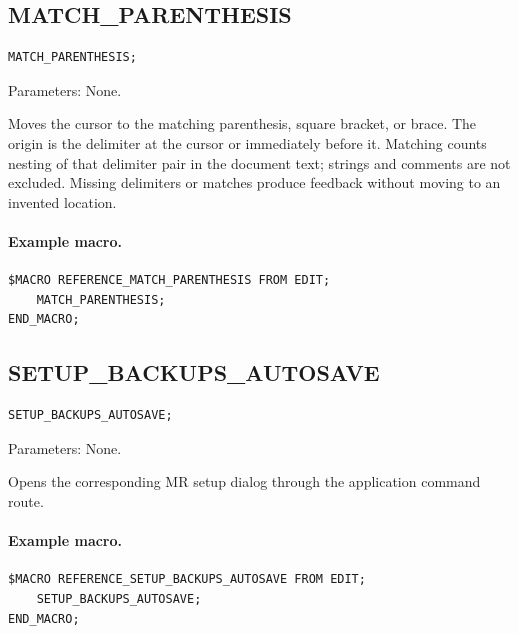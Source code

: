 \documentclass[a4paper,10pt,twoside,openany]{book}
\newenvironment{mrmacextension}{\begin{changebar}}{\end{changebar}}
\begin{document}
\begin{mrmacextension}
\label{prim:procedure-match-parenthesis}
\subsection*{MATCH\_PARENTHESIS}
\begin{verbatim}
MATCH_PARENTHESIS;
\end{verbatim}
Parameters: None.

Moves the cursor to the matching parenthesis, square bracket, or brace. The
origin is the delimiter at the cursor or immediately before it. Matching
counts nesting of that delimiter pair in the document text; strings and
comments are not excluded. Missing delimiters or matches produce feedback
without moving to an invented location.

\paragraph{Example macro.}
\begin{verbatim}
$MACRO REFERENCE_MATCH_PARENTHESIS FROM EDIT;
    MATCH_PARENTHESIS;
END_MACRO;
\end{verbatim}
\end{mrmacextension}

\begin{mrmacextension}
\label{prim:procedure-setup-backups-autosave}
\subsection*{SETUP\_BACKUPS\_AUTOSAVE}
\begin{verbatim}
SETUP_BACKUPS_AUTOSAVE;
\end{verbatim}
Parameters: None.

Opens the corresponding MR setup dialog through the application command route.

\paragraph{Example macro.}
\begin{verbatim}
$MACRO REFERENCE_SETUP_BACKUPS_AUTOSAVE FROM EDIT;
    SETUP_BACKUPS_AUTOSAVE;
END_MACRO;
\end{verbatim}
\end{mrmacextension}
\end{document}
